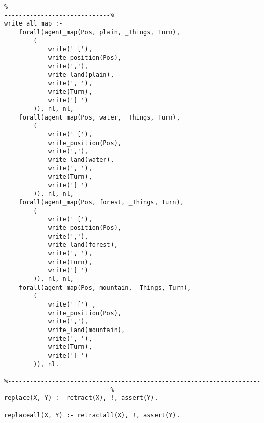 \documentclass[a4paper,12pt]{report}
\begin{document}
\begin{scriptsize}
\begin{verbatim}
%--------------------------------------------------------------------------------------------------%
write_all_map :-
    forall(agent_map(Pos, plain, _Things, Turn), 
        (
            write(' ['), 
            write_position(Pos), 
            write(','), 
            write_land(plain), 
            write(', '), 
            write(Turn), 
            write('] ')
        )), nl, nl,
    forall(agent_map(Pos, water, _Things, Turn), 
        (
            write(' ['), 
            write_position(Pos), 
            write(','), 
            write_land(water), 
            write(', '), 
            write(Turn), 
            write('] ')
        )), nl, nl,
    forall(agent_map(Pos, forest, _Things, Turn), 
        (
            write(' ['),
            write_position(Pos),
            write(','),
            write_land(forest),
            write(', '),
            write(Turn),
            write('] ')
        )), nl, nl,
    forall(agent_map(Pos, mountain, _Things, Turn), 
        (
            write(' [') , 
            write_position(Pos), 
            write(','), 
            write_land(mountain), 
            write(', '), 
            write(Turn), 
            write('] ')
        )), nl.

%--------------------------------------------------------------------------------------------------%
replace(X, Y) :- retract(X), !, assert(Y).

replaceall(X, Y) :- retractall(X), !, assert(Y).
\end{verbatim}
\end{scriptsize}
\end{document}
